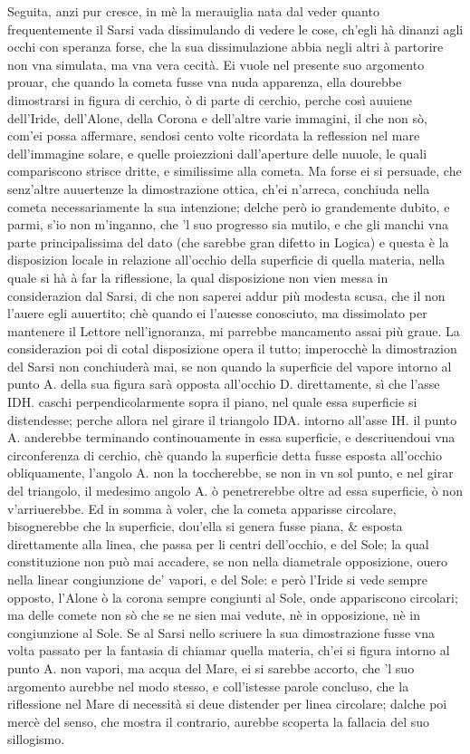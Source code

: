 \documentclass[11pt,twoside,openany]{book}
\begin{document}
Seguita, anzi pur cresce, in mè la merauiglia nata dal veder quanto frequentemente il Sarsi vada dissimulando di vedere le cose, ch'egli hà dinanzi agli occhi con speranza forse, che la sua dissimulazione abbia negli altri à partorire non vna simulata, ma vna vera cecità. Ei vuole nel presente suo argomento prouar, che quando la cometa fusse vna nuda apparenza, ella dourebbe dimostrarsi in figura di cerchio, ò di parte di cerchio, perche così auuiene dell'Iride, dell'Alone, della Corona e dell'altre varie immagini, il che non sò, com'ei possa affermare, sendosi cento volte ricordata la reflession nel mare dell'immagine solare, e quelle proiezzioni dall'aperture delle nuuole, le quali compariscono strisce dritte, e similissime alla cometa. Ma forse ei si persuade, che senz'altre auuertenze la dimostrazione ottica, ch'ei n'arreca, conchiuda nella cometa necessariamente la sua intenzione; delche però io grandemente dubito, e parmi, s'io non m'inganno, che 'l suo progresso sia mutilo, e che gli manchi vna parte principalissima del dato (che sarebbe gran difetto in Logica) e questa è la disposizion locale in relazione all'occhio della superficie di quella materia, nella quale si hà à far la riflessione, la qual disposizione non vien messa in considerazion dal Sarsi, di che non saperei addur più modesta scusa, che il non l'auere egli auuertito; chè quando ei l'auesse conosciuto, ma dissimolato per mantenere il Lettore nell'ignoranza, mi parrebbe mancamento assai più graue. La considerazion poi di cotal disposizione opera il tutto; imperocchè la dimostrazion del Sarsi non conchiuderà mai, se non quando la superficie del vapore intorno al punto A. della sua figura sarà opposta all'occhio D. direttamente, sì che l'asse IDH. caschi perpendicolarmente sopra il piano, nel quale essa superficie si distendesse; perche allora nel girare il triangolo IDA. intorno all'asse IH. il punto A. anderebbe terminando continouamente in essa superficie, e descriuendoui vna circonferenza di cerchio, chè quando la superficie detta fusse esposta all'occhio obliquamente, l'angolo A. non la toccherebbe, se non in vn sol punto, e nel girar del triangolo, il medesimo angolo A. ò penetrerebbe oltre ad essa superficie, ò non v'arriuerebbe. Ed in somma à voler, che la cometa apparisse circolare, bisognerebbe che la superficie, dou'ella si genera fusse piana, \& esposta direttamente alla linea, che passa per li centri dell'occhio, e del Sole; la qual constituzione non può mai accadere, se non nella diametrale opposizione, ouero nella linear congiunzione de' vapori, e del Sole: e però l'Iride si vede sempre opposto, l'Alone ò la corona sempre congiunti al Sole, onde appariscono circolari; ma delle comete non sò che se ne sien mai vedute, nè in opposizione, nè in congiunzione al Sole. Se al Sarsi nello scriuere la sua dimostrazione fusse vna volta passato per la fantasia di chiamar quella materia, ch'ei si figura intorno al punto A. non vapori, ma acqua del Mare, ei si sarebbe accorto, che 'l suo argomento aurebbe nel modo stesso, e coll'istesse parole concluso, che la riflessione nel Mare di necessità si deue distender per linea circolare; dalche poi mercè del senso, che mostra il contrario, aurebbe scoperta la fallacia del suo sillogismo.
\end{document}

